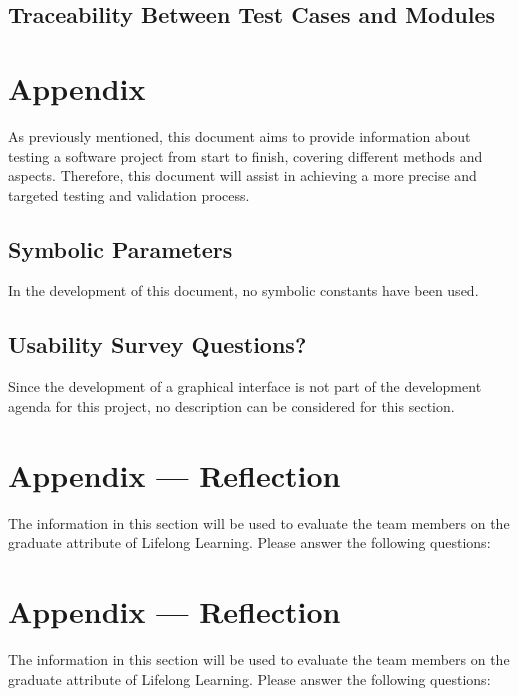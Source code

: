 \documentclass[12pt, titlepage]{article}
\begin{document}
\subsection{Traceability Between Test Cases and Modules}

				


\newpage

\section{Appendix}

As previously mentioned, this document aims to provide information about testing a software project from start to finish, covering different methods and aspects. Therefore, this document will assist in achieving a more precise and targeted testing and validation process.

\subsection{Symbolic Parameters}

In the development of this document, no symbolic constants have been used.
\subsection{Usability Survey Questions?}

Since the development of a graphical interface is not part of the development agenda for this project, no description can be considered for this section.

\newpage{}
\section*{Appendix --- Reflection}

The information in this section will be used to evaluate the team members on the
graduate attribute of Lifelong Learning.  Please answer the following questions:

\newpage{}
\section*{Appendix --- Reflection}


The information in this section will be used to evaluate the team members on the
graduate attribute of Lifelong Learning.  Please answer the following questions:
\end{document}
